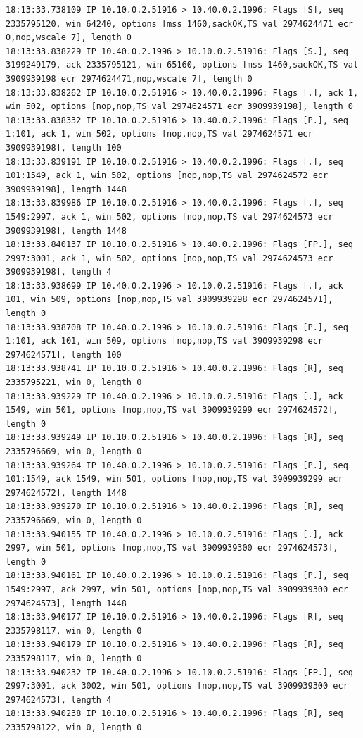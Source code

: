 \documentclass[a4paper,12pt]{article}
\begin{document}
\begin{Verbatim}
18:13:33.738109 IP 10.10.0.2.51916 > 10.40.0.2.1996: Flags [S], seq 2335795120, win 64240, options [mss 1460,sackOK,TS val 2974624471 ecr 0,nop,wscale 7], length 0
18:13:33.838229 IP 10.40.0.2.1996 > 10.10.0.2.51916: Flags [S.], seq 3199249179, ack 2335795121, win 65160, options [mss 1460,sackOK,TS val 3909939198 ecr 2974624471,nop,wscale 7], length 0
18:13:33.838262 IP 10.10.0.2.51916 > 10.40.0.2.1996: Flags [.], ack 1, win 502, options [nop,nop,TS val 2974624571 ecr 3909939198], length 0
18:13:33.838332 IP 10.10.0.2.51916 > 10.40.0.2.1996: Flags [P.], seq 1:101, ack 1, win 502, options [nop,nop,TS val 2974624571 ecr 3909939198], length 100
18:13:33.839191 IP 10.10.0.2.51916 > 10.40.0.2.1996: Flags [.], seq 101:1549, ack 1, win 502, options [nop,nop,TS val 2974624572 ecr 3909939198], length 1448
18:13:33.839986 IP 10.10.0.2.51916 > 10.40.0.2.1996: Flags [.], seq 1549:2997, ack 1, win 502, options [nop,nop,TS val 2974624573 ecr 3909939198], length 1448
18:13:33.840137 IP 10.10.0.2.51916 > 10.40.0.2.1996: Flags [FP.], seq 2997:3001, ack 1, win 502, options [nop,nop,TS val 2974624573 ecr 3909939198], length 4
18:13:33.938699 IP 10.40.0.2.1996 > 10.10.0.2.51916: Flags [.], ack 101, win 509, options [nop,nop,TS val 3909939298 ecr 2974624571], length 0
18:13:33.938708 IP 10.40.0.2.1996 > 10.10.0.2.51916: Flags [P.], seq 1:101, ack 101, win 509, options [nop,nop,TS val 3909939298 ecr 2974624571], length 100
18:13:33.938741 IP 10.10.0.2.51916 > 10.40.0.2.1996: Flags [R], seq 2335795221, win 0, length 0
18:13:33.939229 IP 10.40.0.2.1996 > 10.10.0.2.51916: Flags [.], ack 1549, win 501, options [nop,nop,TS val 3909939299 ecr 2974624572], length 0
18:13:33.939249 IP 10.10.0.2.51916 > 10.40.0.2.1996: Flags [R], seq 2335796669, win 0, length 0
18:13:33.939264 IP 10.40.0.2.1996 > 10.10.0.2.51916: Flags [P.], seq 101:1549, ack 1549, win 501, options [nop,nop,TS val 3909939299 ecr 2974624572], length 1448
18:13:33.939270 IP 10.10.0.2.51916 > 10.40.0.2.1996: Flags [R], seq 2335796669, win 0, length 0
18:13:33.940155 IP 10.40.0.2.1996 > 10.10.0.2.51916: Flags [.], ack 2997, win 501, options [nop,nop,TS val 3909939300 ecr 2974624573], length 0
18:13:33.940161 IP 10.40.0.2.1996 > 10.10.0.2.51916: Flags [P.], seq 1549:2997, ack 2997, win 501, options [nop,nop,TS val 3909939300 ecr 2974624573], length 1448
18:13:33.940177 IP 10.10.0.2.51916 > 10.40.0.2.1996: Flags [R], seq 2335798117, win 0, length 0
18:13:33.940179 IP 10.10.0.2.51916 > 10.40.0.2.1996: Flags [R], seq 2335798117, win 0, length 0
18:13:33.940232 IP 10.40.0.2.1996 > 10.10.0.2.51916: Flags [FP.], seq 2997:3001, ack 3002, win 501, options [nop,nop,TS val 3909939300 ecr 2974624573], length 4
18:13:33.940238 IP 10.10.0.2.51916 > 10.40.0.2.1996: Flags [R], seq 2335798122, win 0, length 0
\end{Verbatim}
\end{document}
